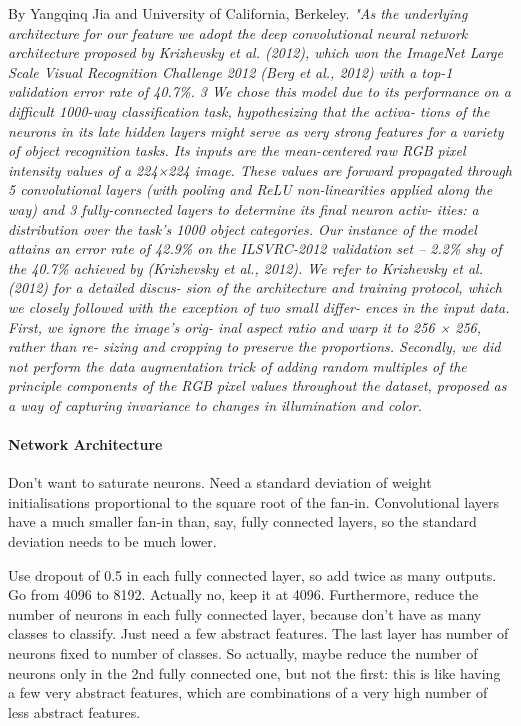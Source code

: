 \documentclass[a4paper,11pt]{article}
\begin{document}
By Yangqinq Jia and University of California, Berkeley. \it{"As the underlying architecture for our feature we adopt the deep convolutional neural network architecture proposed by Krizhevsky et al. (2012), which won the ImageNet Large Scale Visual Recognition Challenge 2012 (Berg
et al., 2012) with a top-1 validation error rate of 40.7\%. 3 We chose this model due to its performance on a difficult 1000-way classification task, hypothesizing that the activa- tions of the neurons in its late hidden layers might serve as very strong features for a variety of object recognition tasks. Its inputs are the mean-centered raw RGB pixel intensity values of a 224×224 image. These values are forward propagated through 5 convolutional layers (with pooling and ReLU non-linearities applied along the way) and 3 fully-connected layers to determine its final neuron activ- ities: a distribution over the task’s 1000 object categories. Our instance of the model attains an error rate of 42.9\% on the ILSVRC-2012 validation set – 2.2\% shy of the 40.7\% achieved by (Krizhevsky et al., 2012).
We refer to Krizhevsky et al. (2012) for a detailed discus- sion of the architecture and training protocol, which we closely followed with the exception of two small differ- ences in the input data. First, we ignore the image’s orig-
inal aspect ratio and warp it to 256 × 256, rather than re- sizing and cropping to preserve the proportions. Secondly, we did not perform the data augmentation trick of adding random multiples of the principle components of the RGB pixel values throughout the dataset, proposed as a way of capturing invariance to changes in illumination and color.}


\paragraph{Network Architecture}

Don't want to saturate neurons. Need a standard deviation of weight initialisations proportional to the square root of the fan-in. Convolutional layers have a much smaller fan-in than, say, fully connected layers, so the standard deviation needs to be much lower.

Use dropout of 0.5 in each fully connected layer, so add twice as many outputs. Go from 4096 to 8192. Actually no, keep it at 4096. Furthermore, reduce the number of neurons in each fully connected layer, because don't have as many classes to classify. Just need a few abstract features. The last layer has number of neurons fixed to number of classes. So actually, maybe reduce the number of neurons only in the 2nd fully connected one, but not the first: this is like having a few very abstract features, which are combinations of a very high number of less abstract features.
\end{document}
